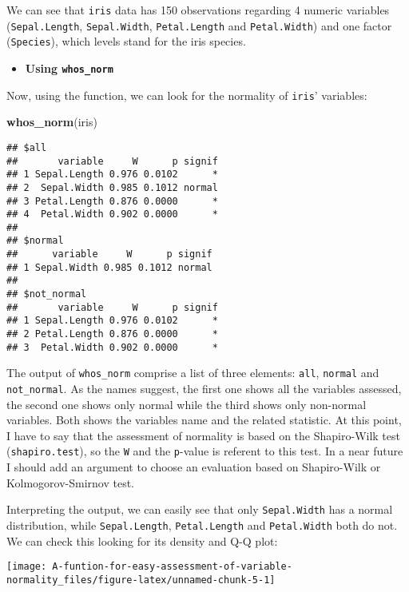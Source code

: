 \documentclass[]{article}
\newenvironment{Shaded}{}{}
\newcommand{\KeywordTok}[1]{\textcolor[rgb]{0.00,0.44,0.13}{\textbf{#1}}}
\newcommand{\NormalTok}[1]{#1}
\providecommand{\tightlist}{%
  \setlength{\itemsep}{0pt}\setlength{\parskip}{0pt}}
\begin{document}
We can see that \texttt{iris} data has 150 observations regarding 4
numeric variables (\texttt{Sepal.Length}, \texttt{Sepal.Width},
\texttt{Petal.Length} and \texttt{Petal.Width}) and one factor
(\texttt{Species}), which levels stand for the iris species.

\begin{itemize}
\tightlist
\item
  \textbf{Using \texttt{whos\_norm}}
\end{itemize}

Now, using the function, we can look for the normality of \texttt{iris}'
variables:

\begin{Shaded}
\begin{Highlighting}[]
\KeywordTok{whos_norm}\NormalTok{(iris)}
\end{Highlighting}
\end{Shaded}

\begin{verbatim}
## $all
##       variable     W      p signif
## 1 Sepal.Length 0.976 0.0102      *
## 2  Sepal.Width 0.985 0.1012 normal
## 3 Petal.Length 0.876 0.0000      *
## 4  Petal.Width 0.902 0.0000      *
## 
## $normal
##      variable     W      p signif
## 1 Sepal.Width 0.985 0.1012 normal
## 
## $not_normal
##       variable     W      p signif
## 1 Sepal.Length 0.976 0.0102      *
## 2 Petal.Length 0.876 0.0000      *
## 3  Petal.Width 0.902 0.0000      *
\end{verbatim}

The output of \texttt{whos\_norm} comprise a list of three elements:
\texttt{all}, \texttt{normal} and \texttt{not\_normal}. As the names
suggest, the first one shows all the variables assessed, the second one
shows only normal while the third shows only non-normal variables. Both
shows the variables name and the related statistic. At this point, I
have to say that the assessment of normality is based on the
Shapiro-Wilk test (\texttt{shapiro.test}), so the \texttt{W} and the
\texttt{p}-value is referent to this test. In a near future I should add
an argument to choose an evaluation based on Shapiro-Wilk or
Kolmogorov-Smirnov test.

Interpreting the output, we can easily see that only
\texttt{Sepal.Width} has a normal distribution, while
\texttt{Sepal.Length}, \texttt{Petal.Length} and \texttt{Petal.Width}
both do not. We can check this looking for its density and Q-Q plot:

\begin{center}\texttt{[image: A-funtion-for-easy-assessment-of-variable-normality\_files/figure-latex/unnamed-chunk-5-1]} \end{center}
\end{document}
